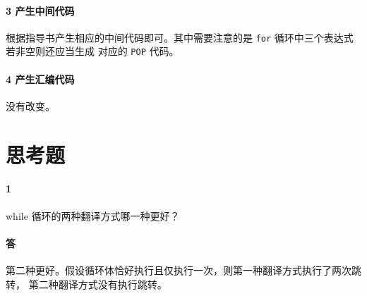 \documentclass[UTF8]{ctexart}
\newcommand{\T}[1]{\texttt{{#1}}}
\begin{document}
            \paragraph{3 产生中间代码} 根据指导书产生相应的中间代码即可。其中需要注意的是 \T{for} 循环中三个表达式若非空则还应当生成
            对应的 \T{POP} 代码。

            \paragraph{4 产生汇编代码} 没有改变。
        
    \section{思考题}
        \paragraph{1} while 循环的两种翻译方式哪一种更好？
        \paragraph{答} 第二种更好。假设循环体恰好执行且仅执行一次，则第一种翻译方式执行了两次跳转，
        第二种翻译方式没有执行跳转。
\end{document}
